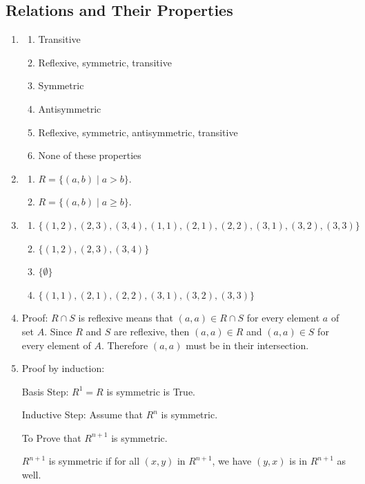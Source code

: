 \documentclass{sig-alternate-05-2015}
\begin{document}
\subsection{Relations and Their Properties}
\begin{enumerate}
\item
\begin{enumerate}
	\item Transitive
	\item Reflexive, symmetric, transitive
	\item Symmetric
	\item Antisymmetric
	\item Reflexive, symmetric, antisymmetric, transitive
	\item None of these properties
\end{enumerate}

\item 
\begin{enumerate}
	\item $R = \{(a, b) \mid a > b\}$.
	\item $R = \{(a, b) \mid a \ge b\}$.
\end{enumerate}

\item
\begin{enumerate}
	\item  $\{(1,2), (2,3), (3,4), (1,1), (2,1), (2,2), (3,1), (3,2), (3,3)\}$
	\item $\{(1,2), (2,3), (3,4)\}$
	\item $\{\emptyset\}$
	\item $\{(1,1), (2,1), (2,2), (3,1), (3,2), (3,3)\}$
\end{enumerate}

\item Proof: $R \cap S$ is reflexive means that $(a,a) \in R\cap S $ for every element $a$ of set $A$.
Since $R$ and $S$ are reflexive, then $(a,a)\in R $ and $(a,a)\in S$ for every element of $A$.
Therefore $(a,a)$ must be in their intersection.

\item Proof by induction:

Basis Step: $R^1= R$ is symmetric is True.

Inductive Step: Assume that $R^n$ is symmetric.

To Prove that $R^{n+1}$ is symmetric.

$R^{n+1}$ is symmetric if for all $(x,y)$ in $R^{n+1}$, we have $(y,x)$ is in $R^{n+1}$ as well.


\end{enumerate}
\end{document}
